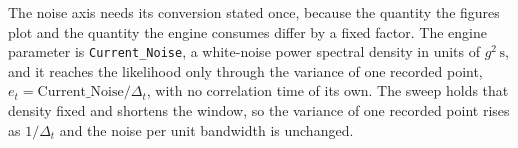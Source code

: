 The noise axis needs its conversion stated once, because the quantity the figures
plot and the quantity the engine consumes differ by a fixed factor. The engine
parameter is \texttt{Current\_Noise}, a white-noise power spectral density in units of
$g^2\,\mathrm{s}$, and it reaches the likelihood only through the variance of one
recorded point, $e_t = \mathrm{Current\_Noise}/\Delta_t$, with no correlation time of
its own. The sweep holds that density fixed and shortens the window, so the variance of
one recorded point rises as $1/\Delta_t$ and the noise per unit bandwidth is unchanged.
